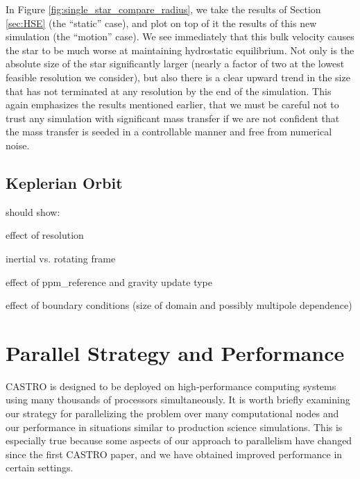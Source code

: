 \documentclass[iop]{emulateapj}
\begin{document}
In Figure \ref{fig:single_star_compare_radius}, we take the results of Section 
\ref{sec:HSE} (the ``static'' case), and plot on top of it the results of this 
new simulation (the ``motion'' case). We see immediately that this bulk velocity
causes the star to be much worse at maintaining hydrostatic equilibrium. Not only 
is the absolute size of the star significantly larger (nearly a factor of two 
at the lowest feasible resolution we consider), but also there is a clear upward 
trend in the size that has not terminated at any resolution by the end of the simulation.
This again emphasizes the results mentioned earlier, that we must be careful not 
to trust any simulation with significant mass transfer if we are not confident that the 
mass transfer is seeded in a controllable manner and free from numerical noise.

\subsection{Keplerian Orbit}\label{sec:kepler}

should show:

effect of resolution

inertial vs. rotating frame

effect of ppm\_reference and gravity update type

effect of boundary conditions (size of domain and possibly multipole dependence)


\section{Parallel Strategy and Performance}\label{sec:Performance}

CASTRO is designed to be deployed on high-performance computing systems using 
many thousands of processors simultaneously. It is worth briefly examining 
our strategy for parallelizing the problem over many computational nodes 
and our performance in situations similar to production science simulations. 
This is especially true because some aspects of our approach to parallelism 
have changed since the first CASTRO paper, and we have obtained improved 
performance in certain settings.
\end{document}
